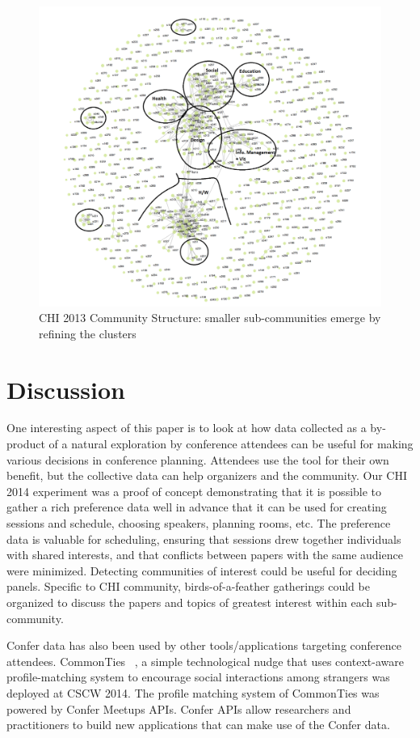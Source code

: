 \documentclass{sigchi}
\begin{document}
\begin{figure}[!h]
\centering
\includegraphics[width=0.95\columnwidth]{chi2013-community-view-15.png}
\caption{CHI 2013 Community Structure: smaller sub-communities emerge by refining the clusters}
\label{chi2013-community-view-15}
\end{figure}

\section{Discussion}
One interesting aspect of this paper is to look at how data collected as a by-product of a natural exploration by conference attendees can be useful for making various decisions in conference planning. Attendees use the tool for their own benefit, but the collective data can help organizers and the community. Our CHI 2014 experiment was a proof of concept demonstrating that it is possible to gather a rich preference data well in advance that it can be used for creating sessions and schedule, choosing speakers, planning rooms, etc. The preference data is valuable for scheduling, ensuring that sessions drew together individuals with shared interests, and that conflicts between papers with the same audience were minimized.  Detecting communities of interest could be useful for deciding panels. Specific to CHI community, birds-of-a-feather gatherings could be organized to discuss the papers and topics of greatest interest within each sub-community.

Confer data has also been used by other tools/applications targeting conference attendees. 
CommonTies ~\cite{Abouzied:2014:CCN:2556420.2556783}, a simple technological nudge that uses context-aware profile-matching system to encourage social interactions among strangers was deployed at CSCW 2014. The profile matching system of CommonTies was powered by Confer Meetups APIs. Confer APIs allow researchers and practitioners to build new applications that can make use of the Confer data.
\end{document}

